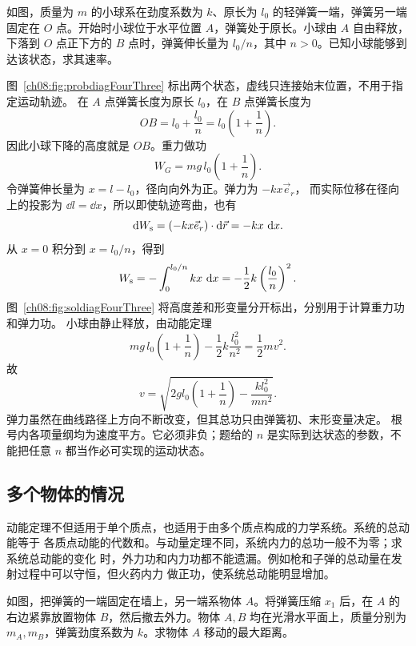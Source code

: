 {
\begin{origexamplebox}{}\label{ch08:ex:s10-4-3}
如图，质量为 $m$ 的小球系在劲度系数为 $k$、原长为 $l_0$ 的轻弹簧一端，弹簧另一端
固定在 $O$ 点。开始时小球位于水平位置 $A$，弹簧处于原长。小球由 $A$ 自由释放，
下落到 $O$ 点正下方的 $B$ 点时，弹簧伸长量为 $l_0/n$，其中 $n>0$。已知小球能够到达该状态，求其速率。
\probdiagFourThree
\end{origexamplebox}

\begin{xesolution}
图~\ref{ch08:fig:probdiagFourThree} 标出两个状态，虚线只连接始末位置，不用于指定运动轨迹。
在 $A$ 点弹簧长度为原长 $l_0$，在 $B$ 点弹簧长度为
\[
 OB=l_0+\frac{l_0}{n}=l_0\left(1+\frac1n\right).
\]
因此小球下降的高度就是 $OB$。重力做功
\[
 W_G=mg\,l_0\left(1+\frac1n\right).
\]
令弹簧伸长量为 $x=l-l_0$，径向向外为正。弹力为 $-kx\vec e_r$，
而实际位移在径向上的投影为 $\dd l=\dd x$，所以即使轨迹弯曲，也有
\[
 \mathop{}\!\mathrm d W_{\rm s}=(-kx\vec e_r)\cdot\mathop{}\!\mathrm d\vec r=-kx\,\mathop{}\!\mathrm d x.
\]
从 $x=0$ 积分到 $x=l_0/n$，得到
\[
 W_{\rm s}=-\int_0^{l_0/n}kx\,\mathop{}\!\mathrm d x=-\frac12k\left(\frac{l_0}{n}\right)^2.
\]
图~\ref{ch08:fig:soldiagFourThree} 将高度差和形变量分开标出，分别用于计算重力功和弹力功。
\soldiagFourThree
小球由静止释放，由动能定理
\[
 mg\,l_0\left(1+\frac1n\right)
 -\frac12k\frac{l_0^2}{n^2}
 =\frac12mv^2.
\]
故
\[
 \boxed{
 v=\sqrt{2gl_0\left(1+\frac1n\right)
 -\frac{k l_0^2}{mn^2}}}.
\]
弹力虽然在曲线路径上方向不断改变，但其总功只由弹簧初、末形变量决定。
根号内各项量纲均为速度平方。它必须非负；题给的 $n$ 是实际到达状态的参数，不能把任意 $n$ 都当作必可实现的运动状态。
\end{xesolution}

\subsection{多个物体的情况}

动能定理不但适用于单个质点，也适用于由多个质点构成的力学系统。系统的总动能等于
各质点动能的代数和。与动量定理不同，系统内力的总功一般不为零；求系统总动能的变化
时，外力功和内力功都不能遗漏。例如枪和子弹的总动量在发射过程中可以守恒，但火药内力
做正功，使系统总动能明显增加。

\begin{origexamplebox}{}\label{ch08:ex:s10-4-4}
如图，把弹簧的一端固定在墙上，另一端系物体 $A$。将弹簧压缩 $x_1$ 后，在 $A$ 的
右边紧靠放置物体 $B$，然后撤去外力。物体 $A,B$ 均在光滑水平面上，质量分别为
$m_A,m_B$，弹簧劲度系数为 $k$。求物体 $A$ 移动的最大距离。
\probdiagFourFour
\end{origexamplebox}

}
